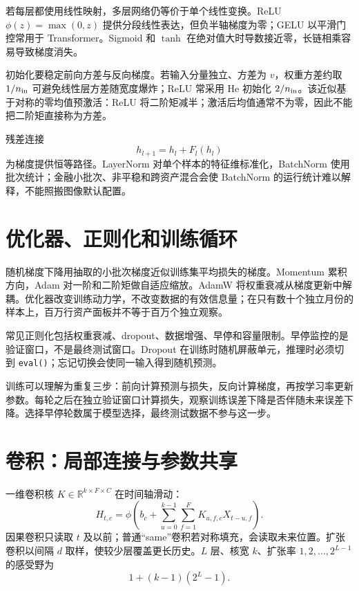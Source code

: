 
若每层都使用线性映射，多层网络仍等价于单个线性变换。ReLU $\phi(z)=\max(0,z)$ 提供分段线性表达，但负半轴梯度为零；GELU 以平滑门控常用于 Transformer。Sigmoid 和 $\tanh$ 在绝对值大时导数接近零，长链相乘容易导致梯度消失。

初始化要稳定前向方差与反向梯度。若输入分量独立、方差为 $v$，权重方差约取 $1/n_{\rm in}$ 可避免线性层方差随宽度爆炸；ReLU 常采用 He 初始化 $2/n_{\rm in}$。该近似基于对称的零均值预激活：ReLU 将二阶矩减半；激活后均值通常不为零，因此不能把二阶矩直接称为方差。

残差连接
\[
h_{l+1}=h_l+F_l(h_l)
\]
为梯度提供恒等路径。LayerNorm 对单个样本的特征维标准化，BatchNorm 使用批次统计；金融小批次、非平稳和跨资产混合会使 BatchNorm 的运行统计难以解释，不能照搬图像默认配置。

\section{优化器、正则化和训练循环}

随机梯度下降用抽取的小批次梯度近似训练集平均损失的梯度。Momentum 累积方向，Adam 对一阶和二阶矩做自适应缩放。AdamW 将权重衰减从梯度更新中解耦。优化器改变训练动力学，不改变数据的有效信息量；在只有数十个独立月份的样本上，百万行资产面板并不等于百万个独立观察。



常见正则化包括权重衰减、dropout、数据增强、早停和容量限制。早停监控的是验证窗口，不是最终测试窗口。Dropout 在训练时随机屏蔽单元，推理时必须切到 \texttt{eval()}；忘记切换会使同一输入得到随机预测。

训练可以理解为重复三步：前向计算预测与损失，反向计算梯度，再按学习率更新参数。每轮之后在独立验证窗口计算损失，观察训练误差下降是否伴随未来误差下降。选择早停轮数属于模型选择，最终测试数据不参与这一步。

\section{卷积：局部连接与参数共享}

一维卷积核 $K\in\mathbb R^{k\times F\times C}$ 在时间轴滑动：
\[
H_{t,c}=\phi\!\left(b_c+
\sum_{u=0}^{k-1}\sum_{f=1}^F K_{u,f,c}X_{t-u,f}\right).
\]
因果卷积只读取 $t$ 及以前；普通“same”卷积若对称填充，会读取未来位置。扩张卷积以间隔 $d$ 取样，使较少层覆盖更长历史。$L$ 层、核宽 $k$、扩张率 $1,2,\ldots,2^{L-1}$ 的感受野为
\[
1+(k-1)(2^L-1).
\]

